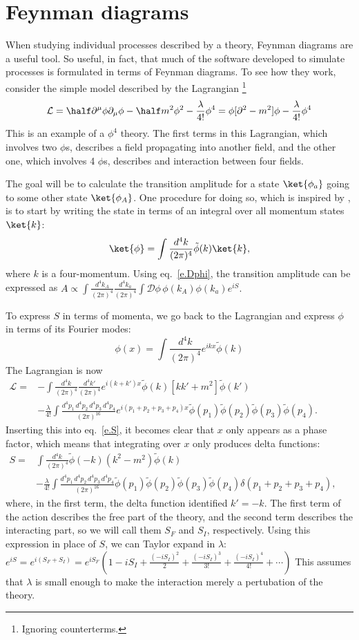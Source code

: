 \section{Feynman diagrams}
When studying individual processes described by a theory, Feynman diagrams are a useful tool. So useful, in fact, that much of the software developed to simulate processes is formulated in terms of Feynman diagrams. To see how they work, consider the simple model described by the Lagrangian \cite{srednicki}\footnote{Ignoring counterterms.}
\[\mathcal L= \half\partial^\mu\phi\partial_\mu\phi-\half m^2\phi^2-\frac{\lambda}{4!}\phi^4=\phi[\partial^2-m^2]\phi-\frac{\lambda}{4!}\phi^4\]
This is an example of a $\phi^4$ theory. The first terms in this Lagrangian, which involves two $\phi$s, describes a field propagating into another field, and the other one, which involves 4 $\phi$s, describes and interaction between four fields.

The goal will be to calculate the transition amplitude for a state $\ket{\phi_a}$ going to some other state $\ket{\phi_A}$. One procedure for doing so, which is inspired by \cite{wiki.feydiag}, is to start by writing the state in terms of an integral over all momentum states $\ket{k}$:
\[\ket{\phi}=\int\frac{d^4k}{(2\pi)^4}\tilde\phi(k)\ket{k},\]
where $k$ is a four-momentum. Using eq.~\eqref{e.Dphi}, the transition amplitude can be expressed as
\(A\propto\int\frac{d^4k_A}{(2\pi)^4}\frac{d^4k_a}{(2\pi)^4}\int\mathcal D\phi\,\phi(k_A)\phi(k_a)e^{iS}.\label{transa}\)

To express $S$ in terms of momenta, we go back to the Lagrangian and express $\phi$ in terms of its Fourier modes:
\[\phi(x)=\int\frac{d^4k}{(2\pi)^4}e^{ikx}\tilde\phi(k)\]
The Lagrangian is now
\(\begin{aligned}\mathcal L=&-\int\frac{d^4k}{(2\pi)^4}\frac{d^4k\prime}{(2\pi)^4} e^{i(k+k\prime)x}\tilde\phi(k)[kk\prime +m^2]\tilde\phi(k\prime)\\
&-\frac{\lambda}{4!}\int\frac{d^4p_1\,d^4p_2\,d^4p_3\,d^4p_4}{(2\pi)^{16}}e^{i(p_1+p_2+p_3+p_4)x}\tilde\phi(p_1)\tilde\phi(p_2)\tilde\phi(p_3)\tilde\phi(p_4).
\end{aligned}\)
Inserting this into eq.~\eqref{e.S}, it becomes clear that $x$ only appears as a phase factor, which means that integrating over $x$ only produces delta functions:
\(\begin{aligned}
S=&\int\frac{d^4k}{(2\pi)^4}\tilde\phi(-k)(k^2-m^2)\tilde\phi(k)\\
&-\frac{\lambda}{4!}\int\frac{d^4p_1\,d^4p_2\,d^4p_3\,d^4p_4}{(2\pi)^{16}}\tilde\phi(p_1)\tilde\phi(p_2)\tilde\phi(p_3)\tilde\phi(p_4)\delta(p_1+p_2+p_3+p_4),
\end{aligned}\)
where, in the first term, the delta function identified $k\prime=-k$. The first term of the action describes the free part of the theory, and the second term describes the interacting part, so we will call them $S_F$ and $S_I$, respectively. Using this expression in place of $S$, we can Taylor expand in $\lambda$:
\(e^{iS}=e^{i(S_F+S_I)}=e^{iS_F}\left(1-iS_I+\frac{(-iS_I)^2}{2}+\frac{(-iS_I)^3}{3!}+\frac{(-iS_I)^4}{4!}+\cdots\right)\)
This assumes that $\lambda$ is small enough to make the interaction merely a pertubation of the theory.



